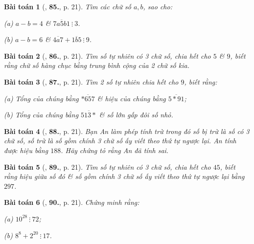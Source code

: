 \documentclass{article}
\numberwithin{equation}{section}
\newtheorem{baitoan}{Bài toán}[section]
\begin{document}
\begin{baitoan}[\cite{Binh_Toan_6_tap_1}, \textbf{85.}, p. 21]
	Tìm các chữ số $a,b$, sao cho:
	\begin{enumerate*}
		\item[(a)] $a - b =4$ \& $\overline{7a5b1}\ \vdots\ 3$.
		\item[(b)] $a - b = 6$ \& $\overline{4a7} + \overline{1b5}\ \vdots\ 9$.
	\end{enumerate*}
\end{baitoan}

\begin{baitoan}[\cite{Binh_Toan_6_tap_1}, \textbf{86.}, p. 21]
	Tìm số tự nhiên có 3 chữ số, chia hết cho $5$ \& $9$, biết rằng chữ số hàng chục bằng trung bình cộng của 2 chữ số kia.
\end{baitoan}

\begin{baitoan}[\cite{Binh_Toan_6_tap_1}, \textbf{87.}, p. 21]
	Tìm 2 số tự nhiên chia hết cho $9$, biết rằng:
	\begin{enumerate*}
		\item[(a)] Tổng của chúng bằng $\overline{*657}$ \& hiệu của chúng bằng $\overline{5*91}$;
		\item[(b)] Tổng của chúng bằng $\overline{513*}$ \& số lớn gấp đôi số nhỏ.
	\end{enumerate*}
\end{baitoan}

\begin{baitoan}[\cite{Binh_Toan_6_tap_1}, \textbf{88.}, p. 21]
	Bạn An làm phép tính trừ trong đó số bị trừ là số có 3 chữ số, số trừ là số gồm chính 3 chữ số ấy viết theo thứ tự ngược lại. An tính được hiệu bằng $188$. Hãy chứng tỏ rằng An đã tính sai.
\end{baitoan}

\begin{baitoan}[\cite{Binh_Toan_6_tap_1}, \textbf{89.}, p. 21]
	Tìm số tự nhiên có 3 chữ số, chia hết cho $45$, biết rằng hiệu giữa số đó \& số gồm chính 3 chữ số ấy viết theo thứ tự ngược lại bằng $297$.
\end{baitoan}

\begin{baitoan}[\cite{Binh_Toan_6_tap_1}, \textbf{90.}, p. 21]
	Chứng minh rằng:
	\begin{enumerate*}
		\item[(a)] $10^{28}\ \vdots\ 72$;
		\item[(b)] $8^8 + 2^{20}\ \vdots\ 17$.
	\end{enumerate*}
\end{baitoan}
\end{document}
